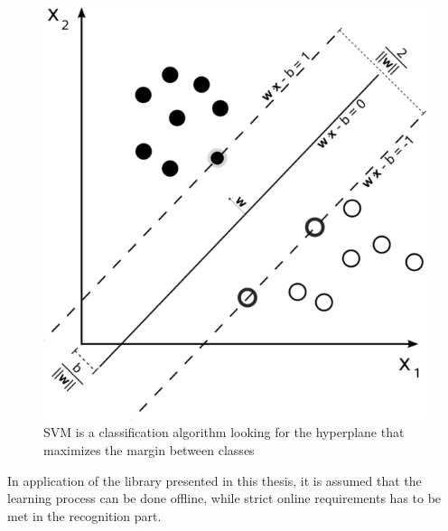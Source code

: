 \begin{figure}[htb]
\centering
 \includegraphics[width=0.6\columnwidth]{figures/SVM.png}
 \caption[]{SVM is a classification algorithm looking for the hyperplane that maximizes the margin between classes\footnotemark}
 \label{svmmargin}
\end{figure}

In application of the library presented in this thesis, it is assumed that the learning process can be done offline, while strict online requirements has to be met in the recognition part. 

